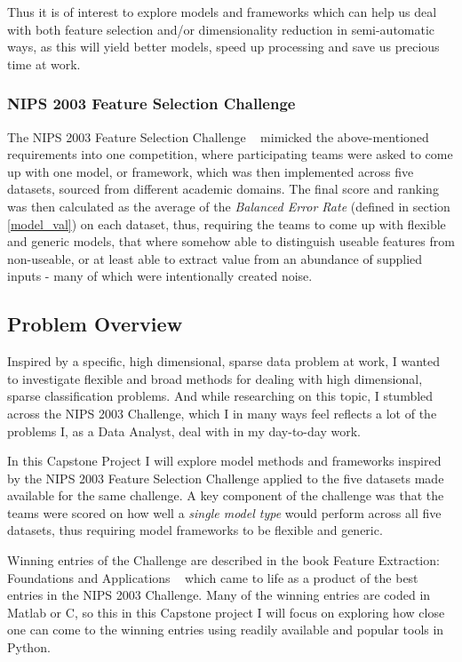 \documentclass[12pt]{article}
\begin{document}
Thus it is of interest to explore models and frameworks which can help us deal with both feature selection and/or dimensionality reduction in semi-automatic ways, as this will yield better models, speed up processing and save us precious time at work.

\subsubsection{NIPS 2003 Feature Selection Challenge}

The NIPS 2003 Feature Selection Challenge ~\cite{nips03workshop} mimicked the above-mentioned requirements into one competition, where participating teams were asked to come up with one model, or framework, which was then implemented across five datasets, sourced from different academic domains. The final score and ranking was then calculated as the average of the \emph{Balanced Error Rate} (defined in section \ref{model_val}) on each dataset, thus, requiring the teams to come up with flexible and generic models, that where somehow able to distinguish useable features from non-useable, or at least able to extract value from an abundance of supplied inputs - many of which were intentionally created noise.

\subsection{Problem Overview}

Inspired by a specific, high dimensional, sparse data problem at work, I wanted to investigate flexible and broad methods for dealing with high dimensional, sparse classification problems. And while researching on this topic, I stumbled across the NIPS 2003 Challenge, which I in many ways feel reflects a lot of the problems I, as a Data Analyst, deal with in my day-to-day work.

In this Capstone Project I will explore model methods and frameworks inspired by the NIPS 2003 Feature Selection Challenge applied to the five datasets made available for the same challenge. A key component of the challenge was that the teams were scored on how well a \emph{single model type} would perform across all five datasets, thus requiring model frameworks to be flexible and generic.

Winning entries of the Challenge are described in the book Feature Extraction: Foundations and Applications ~\cite{nips03book} which came to life as a product of the best entries in the NIPS 2003 Challenge. Many of the winning entries are coded in Matlab or C, so this in this Capstone project I will focus on exploring how close one can come to the winning entries using readily available and popular tools in Python.
\end{document}
